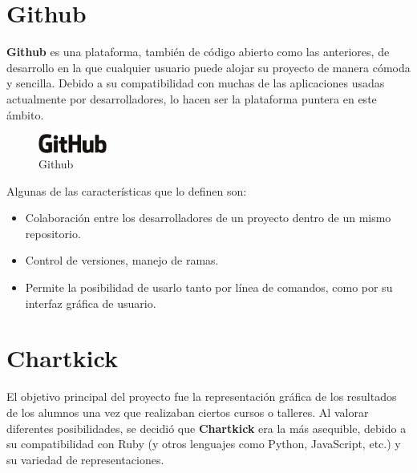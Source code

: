 
\section{Github}
\label{3:sec:4}

\textbf{Github}\cite{Github} es una plataforma, también de código abierto como las anteriores, de desarrollo en la que cualquier usuario puede alojar su proyecto de manera cómoda y sencilla. Debido a su compatibilidad con muchas de las aplicaciones usadas actualmente por desarrolladores, lo hacen ser la plataforma puntera en este ámbito.

\begin{figure}[!th]
\begin{center}
\includegraphics[width=0.2\textwidth]{images/logo_github.eps}
\caption{Github}
\label{fig:7}
\end{center}
\end{figure}

Algunas de las características que lo definen son:

\begin{itemize}
    \item Colaboración entre los desarrolladores de un proyecto dentro de un mismo repositorio.
    \item Control de versiones, manejo de ramas.
    \item Permite la posibilidad de usarlo tanto por línea de comandos, como por su interfaz gráfica de usuario.
\end{itemize}


\section{Chartkick}
\label{3:sec:5}

El objetivo principal del proyecto fue la representación gráfica de los resultados de los alumnos una vez que realizaban ciertos cursos o talleres. Al valorar diferentes posibilidades, se decidió que \textbf{Chartkick}\cite{Chartkick} era la más asequible, 
debido a su compatibilidad con Ruby (y otros lenguajes como Python, JavaScript, etc.) y su variedad de representaciones. 

